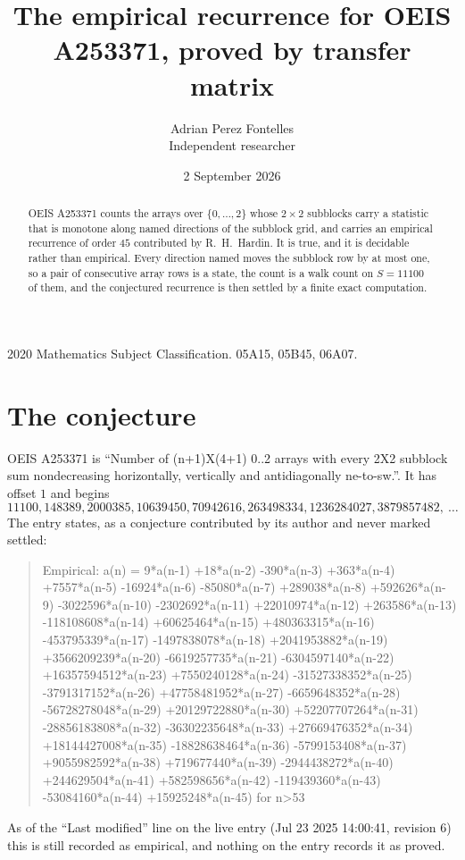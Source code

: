 \documentclass[11pt,a4paper]{article}
\title{The empirical recurrence for OEIS A253371, proved by transfer matrix}
\author{Adrian Perez Fontelles\\ \small Independent researcher}
\date{2 September 2026}
\theoremstyle{plain}
\theoremstyle{definition}
\begin{document}
\maketitle

\begin{abstract}
OEIS A253371 counts the arrays over $\{0,\dots,2\}$ whose $2\times2$ subblocks carry a
statistic that is monotone along named directions of the subblock grid, and carries an
empirical recurrence of order $45$ contributed by R.~H.~Hardin. It is true, and it is
decidable rather than empirical. Every direction named moves the subblock row by at most one,
so a pair of consecutive array rows is a state, the count is a walk count on $S=11100$ of them,
and the conjectured recurrence is then settled by a finite exact computation.
\end{abstract}

\noindent\small 2020 Mathematics Subject Classification. 05A15, 05B45, 06A07.\normalsize

\section{The conjecture}

OEIS A253371 is ``Number of (n+1)X(4+1) 0..2 arrays with every 2X2 subblock sum nondecreasing horizontally, vertically and antidiagonally ne-to-sw.''. It has offset $1$ and begins
\[
11100, 148389, 2000385, 10639450, 70942616, 263498334, 1236284027, 3879857482,\ \dots
\]
The entry states, as a conjecture contributed by its author and never marked settled:
\begin{quote}
Empirical: a(n) = 9*a(n-1) +18*a(n-2) -390*a(n-3) +363*a(n-4) +7557*a(n-5) -16924*a(n-6) -85080*a(n-7) +289038*a(n-8) +592626*a(n-9) -3022596*a(n-10) -2302692*a(n-11) +22010974*a(n-12) +263586*a(n-13) -118108608*a(n-14) +60625464*a(n-15) +480363315*a(n-16) -453795339*a(n-17) -1497838078*a(n-18) +2041953882*a(n-19) +3566209239*a(n-20) -6619257735*a(n-21) -6304597140*a(n-22) +16357594512*a(n-23) +7550240128*a(n-24) -31527338352*a(n-25) -3791317152*a(n-26) +47758481952*a(n-27) -6659648352*a(n-28) -56728278048*a(n-29) +20129722880*a(n-30) +52207707264*a(n-31) -28856183808*a(n-32) -36302235648*a(n-33) +27669476352*a(n-34) +18144427008*a(n-35) -18828638464*a(n-36) -5799153408*a(n-37) +9055982592*a(n-38) +719677440*a(n-39) -2944438272*a(n-40) +244629504*a(n-41) +582598656*a(n-42) -119439360*a(n-43) -53084160*a(n-44) +15925248*a(n-45) for n>53
\end{quote}
As of the ``Last modified'' line on the live entry (Jul 23 2025 14:00:41, revision 6) this is still
recorded as empirical, and nothing on the entry records it as proved.
\end{document}
